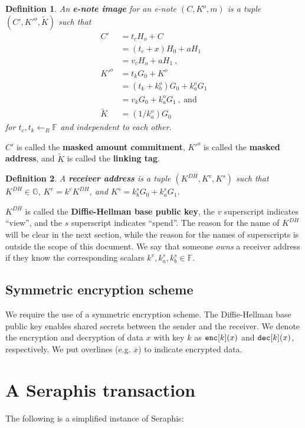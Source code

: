 \documentclass{article}
\newtheorem{definition}{Definition}[section]
\begin{document}
\begin{definition}\label{e-note-img}
An \textbf{\em e-note image} for an e-note $(C, K^o, m)$ is a tuple $(C', K'^o, \tilde{K})$ such that
\begin{align*}
C' &= t_c H_o + C \\ &= (t_c+x)H_0 + aH_1 \\ &= v_c H_o + aH_1 \ , \\
K'^o &= t_k G_0 + K^o \\ &= (t_k + k_b^o) G_0 + k_a^o G_1 \\ &= v_k G_0 + k_a^o G_1 \ ,\ \text{and} \\
\tilde{K} &= (1/k_a^o)G_0
\end{align*}
for $t_c, t_k \leftarrow_R\mathbb{F}$ and independent to each other.
\end{definition}
$C'$ is called the \textbf{masked amount commitment}, $K'^o$ is called the \textbf{masked address}, and $\tilde{K}$ is called the \textbf{linking tag}.

\begin{definition}\label{recv-addr}
A \textbf{\em receiver address} is a tuple $(K^{DH}, K^v, K^s)$  such that $K^{DH}\in\mathbb{G}$, $K^v = k^v K^{DH}$, and $K^s = k_b^s G_0 + k_a^s G_1$.
\end{definition}
$K^{DH}$ is called the \textbf{Diffie-Hellman base public key}, the $v$ superscript indicates ``view'', and the $s$ superscript indicates ``spend''. The reason for the name of $K^{DH}$ will be clear in the next section, while the reason for the names of superscripts is outside the scope of this document. We say that someone \textit{owns} a receiver address if they know the corresponding scalars $k^v, k_a^s, k_b^s \in\mathbb{F}$.

\subsection{Symmetric encryption scheme}
We require the use of a symmetric encryption scheme. The Diffie-Hellman base public key enables shared secrets between the sender and the receiver. We denote the encryption and decryption of data $x$ with key $k$ as $\text{\tt enc}[k](x)$ and $\text{\tt dec}[k](x)$, respectively. We put overlines (e.g. $\overline{x}$) to indicate encrypted data.

\section{A Seraphis transaction}
\noindent The following is a simplified instance of Seraphis:
\end{document}
